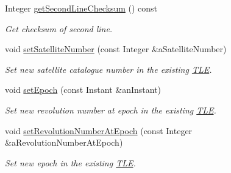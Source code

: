 \begin{DoxyCompactItemize}
Integer \hyperlink{classostk_1_1astro_1_1trajectory_1_1orbit_1_1models_1_1sgp4_1_1_t_l_e_a66f25eab1f7e8f7e511ad0a77da90de7}{get\+Second\+Line\+Checksum} () const
\begin{DoxyCompactList}\small\item\em Get checksum of second line. \end{DoxyCompactList}\item 
void \hyperlink{classostk_1_1astro_1_1trajectory_1_1orbit_1_1models_1_1sgp4_1_1_t_l_e_aaa3ce99b1a69028a94094b95eb91da2c}{set\+Satellite\+Number} (const Integer \&a\+Satellite\+Number)
\begin{DoxyCompactList}\small\item\em Set new satellite catalogue number in the existing \hyperlink{classostk_1_1astro_1_1trajectory_1_1orbit_1_1models_1_1sgp4_1_1_t_l_e}{T\+LE}. \end{DoxyCompactList}\item 
void \hyperlink{classostk_1_1astro_1_1trajectory_1_1orbit_1_1models_1_1sgp4_1_1_t_l_e_a1b31551503d41d052b3270782824e489}{set\+Epoch} (const Instant \&an\+Instant)
\begin{DoxyCompactList}\small\item\em Set new revolution number at epoch in the existing \hyperlink{classostk_1_1astro_1_1trajectory_1_1orbit_1_1models_1_1sgp4_1_1_t_l_e}{T\+LE}. \end{DoxyCompactList}\item 
void \hyperlink{classostk_1_1astro_1_1trajectory_1_1orbit_1_1models_1_1sgp4_1_1_t_l_e_a71f0c58af0aac913f7025f7f7e9500d3}{set\+Revolution\+Number\+At\+Epoch} (const Integer \&a\+Revolution\+Number\+At\+Epoch)
\begin{DoxyCompactList}\small\item\em Set new epoch in the existing \hyperlink{classostk_1_1astro_1_1trajectory_1_1orbit_1_1models_1_1sgp4_1_1_t_l_e}{T\+LE}. \end{DoxyCompactList}\end{DoxyCompactItemize}
